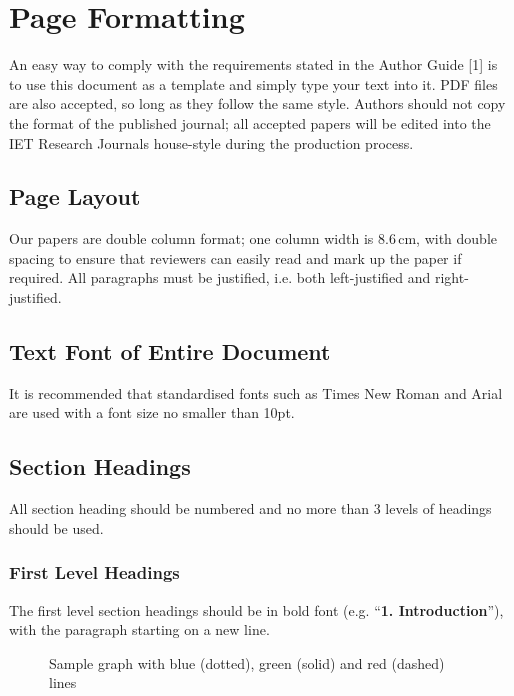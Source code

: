 \documentclass{cta-author}
\begin{document}
\section{Page Formatting}\label{sec5}

An easy way to comply with the requirements stated in the
Author Guide [1] is to use this document as a template
and simply type your text into it. PDF files are also
accepted, so long as they follow the same style. Authors
should not copy the format of the published journal; all
accepted papers will be edited into the IET Research
Journals house-style during the production process.

\subsection{Page Layout}\label{subsec5.1}

Our papers are double column format; one column width is
8.6\,cm, with double spacing to ensure that reviewers can
easily read and mark up the paper if required. All
paragraphs must be justified, i.e. both left-justified and
right-justified.

\subsection{Text Font of Entire Document}\label{subsec5.2}


It is recommended that standardised fonts such as Times New
Roman and Arial are used with a font size no smaller than
10pt.

\subsection{Section Headings}\label{subsec5.3}

All section heading should be numbered and no more than 3
levels of headings should be used.

\subsubsection{First Level Headings}\label{subsubsec5.3.1} The first level section headings
should be in bold font (e.g. ``\textbf{1. Introduction}''),
with the paragraph starting on a new line.

\begin{figure}[!t]
\caption{Sample graph with blue (dotted), green (solid) and red (dashed) lines
\label{fig1}}
\end{figure}
\end{document}
